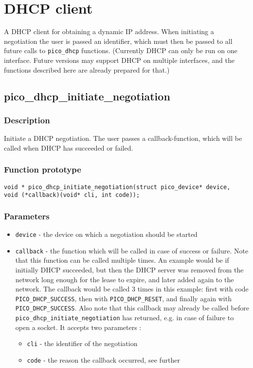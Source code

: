 \section{DHCP client}

A DHCP client for obtaining a dynamic IP address.
When initiating a negotiation the user is passed an identifier,
which must then be passed to all future calls to \texttt{pico\_dhcp} functions.
(Currently DHCP can only be run on one interface. Future versions may support
DHCP on multiple interfaces, and the functions described here are already prepared for that.)


\subsection{pico\_dhcp\_initiate\_negotiation}

\subsubsection*{Description}
Initiate a DHCP negotiation. The user passes a callback-function, which will be called
when DHCP has succeeded or failed.

\subsubsection*{Function prototype}
\begin{verbatim}
void * pico_dhcp_initiate_negotiation(struct pico_device* device,
void (*callback)(void* cli, int code));
\end{verbatim}


\subsubsection*{Parameters}
\begin{itemize}[noitemsep]
\item \texttt{device} - the device on which a negotiation should be started
\item \texttt{callback} - the function which will be called in case of success or failure.
Note that this function can be called multiple times. An example would be if initially DHCP
succeeded, but then the DHCP server was removed from the network long enough for the lease
to expire, and later added again to the network. The callback would be called 3 times in
this example: first with code \texttt{PICO\_DHCP\_SUCCESS}, then with \texttt{PICO\_DHCP\_RESET},
and finally again with \texttt{PICO\_DHCP\_SUCCESS}.
Also note that this callback may already be called before \texttt{pico\_dhcp\_initiate\_negotiation}
has returned, e.g. in case of failure to open a socket.
It accepts two parameters : 
\begin{itemize}[noitemsep]
\item \texttt{cli} - the identifier of the negotiation
\item \texttt{code} - the reason the callback occurred, see further
\end{itemize}
\end{itemize}

